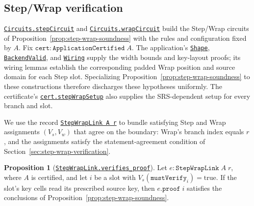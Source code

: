 \documentclass[11pt,a4paper]{article}
\newcommand{\inlinecode}[1]{\mbox{\texttt{#1}}}
\theoremstyle{definition}
\theoremstyle{insetstatement}
\newtheorem{propositiontext}[example]{Proposition}
\newenvironment{statementblock}
  {\begin{list}{}{%
    \setlength{\leftmargin}{0pt}%
    \setlength{\rightmargin}{0pt}%
    \setlength{\labelwidth}{0pt}%
    \setlength{\labelsep}{0pt}%
    \setlength{\itemindent}{0pt}%
    \setlength{\listparindent}{0pt}%
    \setlength{\topsep}{.7\baselineskip plus 2pt minus 1pt}%
    \setlength{\partopsep}{0pt}%
    \setlength{\parsep}{0pt}%
    \setlength{\itemsep}{0pt}}%
    \item\relax}
  {\end{list}}
\newenvironment{proposition}[1][]
  {\begin{statementblock}\begin{propositiontext}[{#1}]\pushQED{\qed}}
  {\popQED\end{propositiontext}\end{statementblock}}
\begin{document}
\subsection{Step/Wrap verification}
\label{sec:application-step-wrap}

\href{https://github.com/l-adic/snarky/blob/main/formal/pickles/Pickles/Application/Circuit.lean\#L127}{\inlinecode{Circuits.stepCircuit}}
and \href{https://github.com/l-adic/snarky/blob/main/formal/pickles/Pickles/Application/Circuit.lean\#L141}{\inlinecode{Circuits.wrapCircuit}}
build the Step/Wrap circuits of Proposition~\ref{prop:step-wrap-soundness}
with the rules and configuration fixed by $A$.
Fix $\mathtt{cert}:\mathtt{ApplicationCertified}\;A$.
The application's
\href{https://github.com/l-adic/snarky/blob/main/formal/pickles/Pickles/Application/Description.lean\#L55}{\inlinecode{Shape}},
\href{https://github.com/l-adic/snarky/blob/main/formal/pickles/Pickles/Application/Wiring.lean\#L74}{\inlinecode{BackendValid}},
and \href{https://github.com/l-adic/snarky/blob/main/formal/pickles/Pickles/Application/Wiring.lean\#L90}{\inlinecode{Wiring}}
supply the width bounds and key-layout proofs;
its wiring lemmas establish the corresponding padded Wrap position and
source domain for each Step slot. Specializing Proposition~\ref{prop:step-wrap-soundness} to these
constructions therefore discharges these hypotheses uniformly.
The certificate's \href{https://github.com/l-adic/snarky/blob/main/formal/pickles/Pickles/Application/CheckedCompile.lean\#L216}{\inlinecode{cert.stepWrapSetup}} also supplies the SRS-dependent setup
for every branch and slot.

We use the record
\href{https://github.com/l-adic/snarky/blob/main/formal/pickles/Pickles/Application/Run.lean\#L60}{\inlinecode{StepWrapLink A r}}
to bundle satisfying Step and Wrap assignments $(V_s,V_w)$ that agree on
the boundary: Wrap's branch index equals $r$, and the assignments satisfy
the statement-agreement condition of Section~\ref{sec:step-wrap-verification}.

\begin{proposition}[\href{https://github.com/l-adic/snarky/blob/main/formal/pickles/Pickles/Application/Verify.lean\#L284}{\inlinecode{StepWrapLink.verifies\_proof}}]
\label{prop:application-step-wrap}
Let $e:\mathtt{StepWrapLink}\;A\;r$, where $A$ is certified, and let $i$ be a slot with
\mbox{$V_s(\mathtt{mustVerify}_i)=\mathrm{true}$}.
If the slot's key cells read its prescribed source key, then
$e.\mathtt{proof}\;i$ satisfies the conclusions of
Proposition~\ref{prop:step-wrap-soundness}.
\end{proposition}
\end{document}
